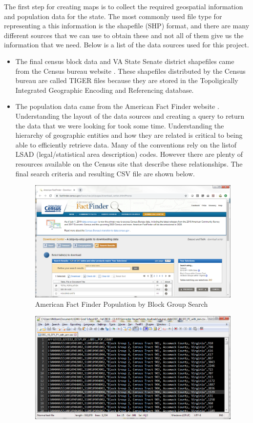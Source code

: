 \documentclass[11pt]{article}
\begin{document}
The first step for creating maps is to collect the required geospatial information and population data for the state. The most commonly used file type for representing a this information is the shapefile (SHP) format, and there are many different sources that we can use to obtain these and not all of them give us the information that we need. Below is a list of the data sources used for this project.
\begin{itemize}
	\item The final census block data and VA State Senate district shapefiles came from the Census bureau website \cite{TigerBG} \cite{VA_SLDU}. These shapefiles distributed by the Census bureau are called TIGER files because they are stored in the Topoligically Integrated Geographic Encoding and Referencing database.
	\item The population data came from the American Fact Finder website \cite{AFF}. Understanding the layout of the data sources and creating a query to return the data that we were looking for took some time. Understanding the hierarchy of geographic entities and how they are related is critical to being able to efficiently retrieve data. Many of the conventions rely on the listof LSAD (legal/statistical area description) codes. However there are plenty of resources available on the Census site that describe these relationships\cite{CensusGeoHelp}. The final  search criteria and resulting CSV file are shown below. 
	\begin{figure}[H]
		\centering
		\includegraphics[width=.6\textwidth]{aff}
		\caption{American Fact Finder Population by Block Group Search}
		\label{fig:dewnfiweofn}
	\end{figure}
	\begin{figure}[H]
		\centering
		\includegraphics[width=.6\textwidth]{popdata}

\end{figure}
\end{itemize}
\end{document}
